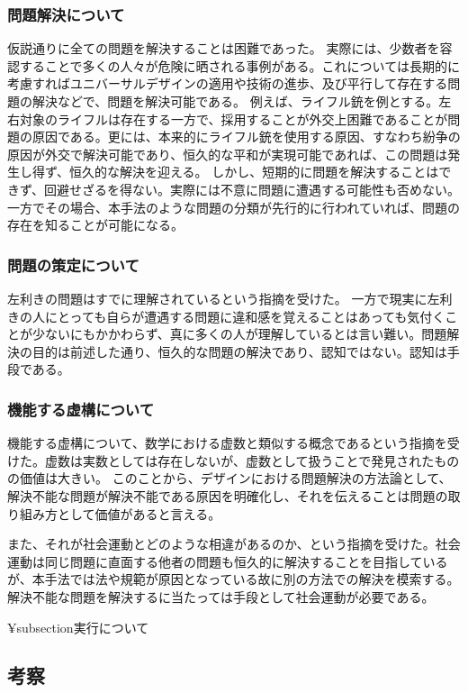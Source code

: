 \documentclass{jsarticle}
\begin{document}
\subsubsection{問題解決について}
仮説通りに全ての問題を解決することは困難であった。
実際には、少数者を容認することで多くの人々が危険に晒される事例がある。これについては長期的に考慮すればユニバーサルデザインの適用や技術の進歩、及び平行して存在する問題の解決などで、問題を解決可能である。
例えば、ライフル銃を例とする。左右対象のライフルは存在する一方で、採用することが外交上困難であることが問題の原因である。更には、本来的にライフル銃を使用する原因、すなわち紛争の原因が外交で解決可能であり、恒久的な平和が実現可能であれば、この問題は発生し得ず、恒久的な解決を迎える。
しかし、短期的に問題を解決することはできず、回避せざるを得ない。実際には不意に問題に遭遇する可能性も否めない。
一方でその場合、本手法のような問題の分類が先行的に行われていれば、問題の存在を知ることが可能になる。

\subsubsection{問題の策定について}
左利きの問題はすでに理解されているという指摘を受けた。
一方で現実に左利きの人にとっても自らが遭遇する問題に違和感を覚えることはあっても気付くことが少ないにもかかわらず、真に多くの人が理解しているとは言い難い。問題解決の目的は前述した通り、恒久的な問題の解決であり、認知ではない。認知は手段である。


\subsubsection{機能する虚構について}
機能する虚構について、数学における虚数と類似する概念であるという指摘を受けた。虚数は実数としては存在しないが、虚数として扱うことで発見されたものの価値は大きい。
このことから、デザインにおける問題解決の方法論として、解決不能な問題が解決不能である原因を明確化し、それを伝えることは問題の取り組み方として価値があると言える。

また、それが社会運動とどのような相違があるのか、という指摘を受けた。社会運動は同じ問題に直面する他者の問題も恒久的に解決することを目指しているが、本手法では法や規範が原因となっている故に別の方法での解決を模索する。解決不能な問題を解決するに当たっては手段として社会運動が必要である。


¥subsection{実行について}



\subsection{考察}
\end{document}
